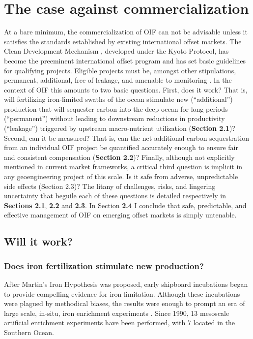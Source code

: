 \section{The case against commercialization}

At a bare minimum, the commercialization of OIF can not be advisable unless it satisfies the standards established by existing international offset markets. The Clean Development Mechanism \parencite{GillenwaterCleanDevelopmentMechanism2011}, developed under the Kyoto Protocol, has become the preeminent international offset program and has set basic guidelines for qualifying projects. Eligible projects must be, amongst other stipulations, permanent, additional, free of leakage, and amenable to monitoring \parencite{GillenwaterCleanDevelopmentMechanism2011}. In the context of OIF this amounts to two basic questions. First, does it work? That is, will fertilizing iron-limited swaths of the ocean stimulate new (“additional”) production that will sequester carbon into the deep ocean for long periods (“permanent”) without leading to downstream reductions in productivity (“leakage”) triggered by upstream macro-nutrient utilization (\textbf{Section 2.1})? Second, can it be measured? That is, can the net additional carbon sequestration from an individual OIF project be quantified accurately enough to ensure fair and consistent compensation (\textbf{Section 2.2})? Finally, although not explicitly mentioned in current market frameworks, a critical third question is implicit in any geoengineering project of this scale. Is it safe from adverse, unpredictable side effects (Section 2.3)? The litany of challenges, risks, and lingering uncertainty that beguile each of these questions is detailed respectively in \textbf{Sections 2.1}, \textbf{2.2} and \textbf{2.3}. In Section \textbf{2.4} I conclude that safe, predictable, and effective management of OIF on emerging offset markets is simply untenable. 

\subsection{Will it work?}

\subsubsection{Does iron fertilization stimulate new production?}

After Martin’s Iron Hypothesis was proposed, early shipboard incubations \parencite{Martincaseiron1991} began to provide compelling evidence for iron limitation. Although these incubations were plagued by methodical biases, the results were enough to prompt an era of large scale, in-situ, iron enrichment experiments \parencite{ChisholmWhatControlsPhytoplankton1991}. Since 1990, 13 mesoscale artificial enrichment experiments have been performed, with 7 located in the Southern Ocean. 

